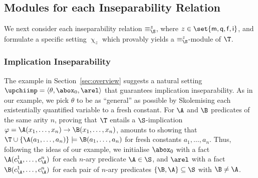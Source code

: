 \subsection{Modules for each Inseparability Relation}\label{sec:all-modules}

We next consider each
inseparability relation  $\equiv^z_{\S}$, where
$z \in \set{\mathsf{m},\mathsf{q},\mathsf{f},\mathsf{i}}$, and
formulate a specific setting $\upchi_z$
which provably yields
a $\equiv^z_{\S}$-module of $\T$. 

\subsubsection{Implication Inseparability}

 
The example in Section~\ref{sec:overview}
suggests a natural setting $\upchiimp=\langle \theta, \abox_0, \arel \rangle$ 
that guarantees implication inseparability. 
As in our example, we pick 
$\theta$ to be as ``general'' as possible by
Skolemising each existentially quantified variable to 
a fresh constant.
For $\A$ and $\B$ predicates of the same arity $n$,
proving that $\T$ entails a $\S$-implication 
$\varphi=\A(x_1, \ldots, x_n)\to\B(x_1, \ldots, x_n)$, 
amounts
to showing that $\T \cup \{\A(a_1, \ldots, a_n)\} \models \B(a_1, \ldots, a_n)$
for fresh constants $a_1, \ldots, a_n$. Thus, following the ideas of our example,
we 
initialise $\abox_0$ with 
a fact  $\A(c_{\A}^1, \ldots, c_{\A}^n)$ for each
$n$-ary predicate $\A \in \S$, and $\arel$ with
a fact 
$\B(c_{\A}^1, \ldots, c_{\A}^n)$
for each pair of $n$-ary predicates $\{\B,\A\} \subseteq \S$ with 
$\B \neq \A$.

